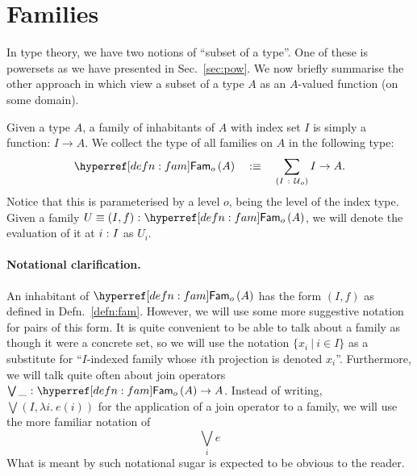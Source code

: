 \section{Families}

In type theory, we have two notions of ``subset of a type''. One of these is powersets
as we have presented in Sec.~\ref{sec:pow}. We now briefly summarise the other approach
in which view a subset of a type $A$ as an $A$-valued function (on some domain).

\begin{defn}[Family]\label{defn:fam}
  Given a type $A$, a family of inhabitants of $A$ with index set $I$ is simply a
  function: $I \rightarrow A$. We collect the type of all families on $A$ in the following type:
  \begin{equation*}
    \sub{o}{A} \quad\is\quad \sigmaty{I}{\univ{}_o}{I \rightarrow A}.
  \end{equation*}
  Notice that this is parameterised by a level $o$, being the level of the index type.
  Given a family $\oftyI{U \equiv (I, f)}{\sub{o}{A}}$, we will denote the evaluation of it at
  $i\hspace{0.1mm}:\hspace{0.1mm}I$ as $U_i$.
\end{defn}

\paragraph*{Notational clarification.} An inhabitant of $\sub{o}{A}$ has the form
$(I, f)$ as defined in Defn.~\ref{defn:fam}. However, we will use some more suggestive
notation for pairs of this form. It is quite convenient to be able to talk about a family
as though it were a concrete set, so we will use the notation $\{ x_i ~|~ i \in I \}$ as a
substitute for ``$I$-indexed family whose $i$th projection is denoted $x_i$''. Furthermore,
we will talk quite often about join operators $\oftyI{\bigvee\_}{\sub{o}{A} \rightarrow A}$. Instead of
writing, $\bigvee (I, \lambda i.~e(i))$ for the application of a join operator to a family, we will
use the more familiar notation of
\begin{equation}\label{eqn:join-syntax}
  \bigvee_i e
\end{equation}
What is meant by such notational sugar is expected to be obvious to the reader.

